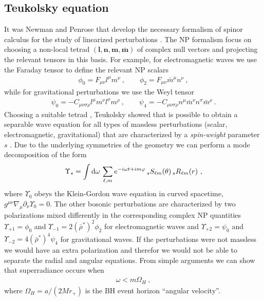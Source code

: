 \subsection{Teukolsky equation}

It was Newman and Penrose that develop the necessary formalism of spinor calculus for the study of linearized perturbations \cite{Newman1962}.
The NP formalism focus on choosing a non-local tetrad $(\bm{l},\bm{n},\bm{m},\bm{\bar{m}})$ of complex null vectors and projecting the relevant tensors in this basis.
For example, for electromagnetic waves we use the Faraday tensor to define the relevant NP scalars
\begin{align}
    \phi_0 = F_{\mu\nu} l^\mu m^\nu ~,\qquad \phi_2 = F_{\mu\nu} \bar{m}^\mu n^\nu ~,
\end{align}
while for gravitational perturbations we use the Weyl tensor
\begin{align}
    \psi_0 = - C_{\mu\nu\sigma\rho} l^\mu m^\nu l^\sigma m^\rho ~,\qquad
    \psi_4 = - C_{\mu\nu\sigma\rho} n^\mu \bar{m}^\nu n^\sigma \bar{m}^\rho ~.
\end{align}
Choosing a suitable tetrad \cite{Kinnersley1969}, Teukolsky showed that is possible to obtain a separable wave equation for all types of massless perturbations (scalar, electromagnetic, gravitational) that are characterized by a \emph{spin-weight} parameter $s$ \cite{Teukolsky1973a, TeukolskyPress1973b, Teukolsky1974}.
Due to the underlying symmetries of the geometry we can perform a mode decomposition of the form 
\begin{align}
    \Upsilon_s = \int \dd \omega \,\sum_{\ell, m} e^{ - i \omega t + i m \varphi } \uu[s]{S}{\ell m}(\theta) \uu[s]{R}{\ell m}(r) ~,
    \label{eq1:modeDecomp}
\end{align}
where $\Upsilon_0$ obeys the Klein-Gordon wave equation in curved spacetime, $g^{\mu\nu} \nabla_\mu \partial_\nu \Upsilon_0 = 0$.
The other bosonic perturbations are characterized by two polarizations mixed differently in the corresponding complex NP quantities $\Upsilon_{+1}=\phi_0$ and $\Upsilon_{-1}=2(\bar{\rho}^*)^2 \phi_2$ for electromagnetic waves and $\Upsilon_{+2}=\psi_0$ and $\Upsilon_{-2}=4(\bar{\rho}^*)^4 \psi_4$ for gravitational waves. If the perturbations were not massless we would have an extra polarization and therefor we would not be able to separate the radial and angular equations.
From simple arguments we can show that superradiance occurs when 
\begin{align}
    \omega < m \Omega_H ~,
\end{align}
where $\Omega_H = a / (2 M r_{+})$ is the BH event horizon ``angular velocity''.

